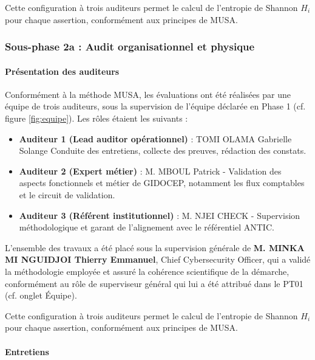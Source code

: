 \documentclass[12pt,a4paper,oneside]{report}
\begin{document}
Cette configuration à trois auditeurs permet le calcul de l'entropie 
de Shannon $H_i$ pour chaque assertion, conformément aux principes 
de MUSA.

\subsubsection{Sous-phase 2a : Audit organisationnel et physique}

\paragraph{Présentation des auditeurs}

Conformément à la méthode MUSA, les évaluations ont été réalisées par 
une équipe de trois auditeurs, sous la supervision de l'équipe déclarée 
en Phase 1 (cf. figure \ref{fig:equipe}). Les rôles étaient les suivants :

\begin{itemize}[label={\color{gold}}, leftmargin=*]
	\item \textbf{Auditeur 1 (Lead auditor opérationnel)} : TOMI OLAMA 
	Gabrielle Solange Conduite des entretiens, collecte des preuves, 
	rédaction des constats.
	
	\item \textbf{Auditeur 2 (Expert métier)} : M. MBOUL Patrick -
	Validation des aspects fonctionnels et métier de GIDOCEP, 
	notamment les flux comptables et le circuit de validation.
	
	\item \textbf{Auditeur 3 (Référent institutionnel)} : M. NJEI CHECK -
	Supervision méthodologique et garant de l'alignement avec le 
	référentiel ANTIC.
\end{itemize}

L'ensemble des travaux a été placé sous la supervision générale de 
\textbf{M. MINKA MI NGUIDJOI Thierry Emmanuel}, Chief Cybersecurity Officer, 
qui a validé la méthodologie employée et assuré la cohérence scientifique 
de la démarche, conformément au rôle de superviseur général qui lui a été 
attribué dans le PT01 (cf. onglet Équipe).

Cette configuration à trois auditeurs permet le calcul de l'entropie 
de Shannon $H_i$ pour chaque assertion, conformément aux principes 
de MUSA.

\paragraph{Entretiens}
\end{document}
